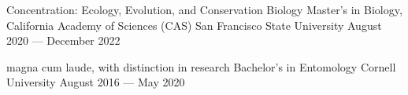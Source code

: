 

\begin{cventries}

  \cventry
    {Concentration: Ecology, Evolution, and Conservation Biology} %
    {Master's in Biology, California Academy of Sciences (CAS)} %
    {San Francisco State University} %
    {August 2020 — December 2022} %
    {}
  
  \cventry
    {magna cum laude, with distinction in research} %
    {Bachelor's in Entomology} %
    {Cornell University} %
    {August 2016 — May 2020} %
    {}

\end{cventries}
